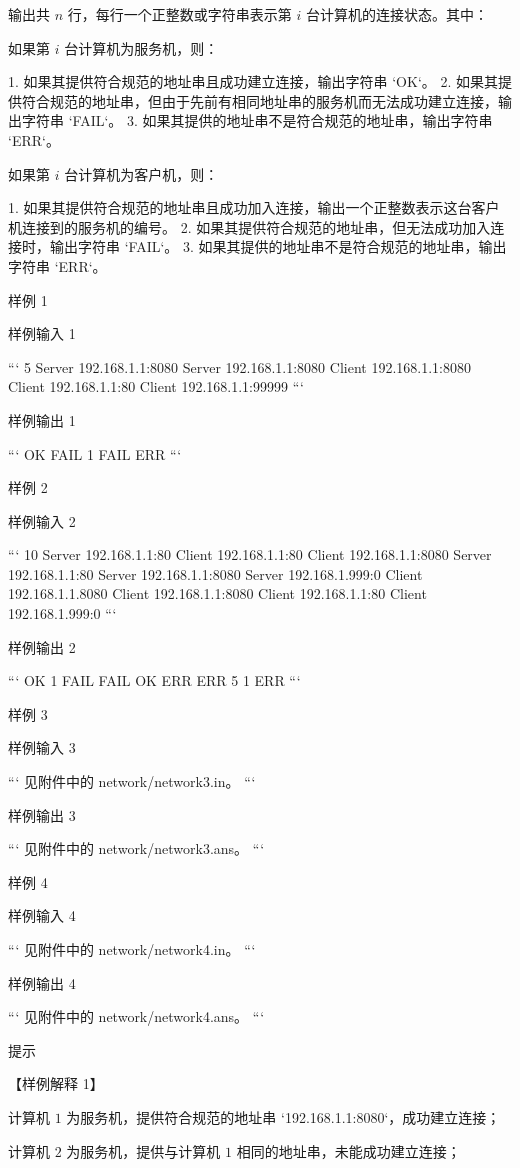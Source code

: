 \documentclass[12pt,twiside,a4paper]{ctexbook}
\numberwithin{chapter}{part}
\begin{document}
输出共 $n$ 行，每行一个正整数或字符串表示第 $i$ 台计算机的连接状态。其中：

如果第 $i$ 台计算机为服务机，则：

1. 如果其提供符合规范的地址串且成功建立连接，输出字符串 `OK`。
2. 如果其提供符合规范的地址串，但由于先前有相同地址串的服务机而无法成功建立连接，输出字符串 `FAIL`。
3. 如果其提供的地址串不是符合规范的地址串，输出字符串 `ERR`。

如果第 $i$ 台计算机为客户机，则：

1. 如果其提供符合规范的地址串且成功加入连接，输出一个正整数表示这台客户机连接到的服务机的编号。
2. 如果其提供符合规范的地址串，但无法成功加入连接时，输出字符串 `FAIL`。
3. 如果其提供的地址串不是符合规范的地址串，输出字符串 `ERR`。

 样例 1

 样例输入 1

```
5
Server 192.168.1.1:8080
Server 192.168.1.1:8080
Client 192.168.1.1:8080
Client 192.168.1.1:80
Client 192.168.1.1:99999
```

 样例输出 1

```
OK
FAIL
1
FAIL
ERR
```

 样例 2

 样例输入 2

```
10
Server 192.168.1.1:80
Client 192.168.1.1:80
Client 192.168.1.1:8080
Server 192.168.1.1:80
Server 192.168.1.1:8080
Server 192.168.1.999:0
Client 192.168.1.1.8080
Client 192.168.1.1:8080
Client 192.168.1.1:80
Client 192.168.1.999:0
```

 样例输出 2

```
OK
1
FAIL
FAIL
OK
ERR
ERR
5
1
ERR
```

 样例 3

 样例输入 3

```
见附件中的 network/network3.in。
```

 样例输出 3

```
见附件中的 network/network3.ans。
```

 样例 4

 样例输入 4

```
见附件中的 network/network4.in。
```

 样例输出 4

```
见附件中的 network/network4.ans。
```

 提示

【样例解释 1】

计算机 $1$ 为服务机，提供符合规范的地址串 `192.168.1.1:8080`，成功建立连接；

计算机 $2$ 为服务机，提供与计算机 $1$ 相同的地址串，未能成功建立连接；
\end{document}
